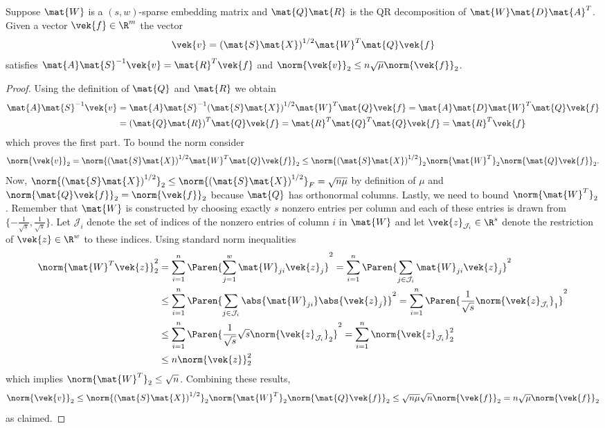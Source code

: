 \begin{lemma}\label{thM:perturbation-vector}
Suppose \(\mat{W}\) is a \((s, w)\)-sparse embedding matrix and \(\mat{Q}\mat{R}\) is the QR decomposition of \(\mat{W}\mat{D}\mat{A}^T\).
Given a vector \(\vek{f} \in \R^m\) the vector
\[ \vek{v} = {(\mat{S}\mat{X})}^{1/2} \mat{W}^T \mat{Q} \vek{f} \]
satisfies \( \mat{A}\mat{S}^{-1}\vek{v} = \mat{R}^T \vek{f} \) and \(\norm{\vek{v}}_2 \leq n \sqrt{\mu} \norm{\vek{f}}_2\).
\end{lemma}
\begin{proof}
Using the definition of \(\mat{Q}\) and \(\mat{R}\) we obtain
\begin{align*}
  \mat{A} \mat{S}^{-1} \vek{v}
  &= \mat{A} \mat{S}^{-1} {(\mat{S}\mat{X})}^{1/2} \mat{W}^T \mat{Q} \vek{f}
   = \mat{A} \mat{D} \mat{W}^T \mat{Q} \vek{f} \\
  &= {(\mat{Q} \mat{R})}^T \mat{Q} \vek{f}
   = \mat{R}^T \mat{Q}^T \mat{Q} \vek{f}
   = \mat{R}^T \vek{f}
\end{align*}
which proves the first part.
To bound the norm consider
\[ 
  \norm{\vek{v}}_2
  = \norm{{(\mat{S}\mat{X})}^{1/2} \mat{W}^T \mat{Q} \vek{f}}_2
  \leq \norm{{(\mat{S}\mat{X})}^{1/2}}_2 \norm{\mat{W}^T}_2 \norm{\mat{Q} \vek{f}}_2.
\]
Now, \(\norm{{(\mat{S}\mat{X})}^{1/2}}_2 \leq \norm{{(\mat{S}\mat{X})}^{1/2}}_F = \sqrt{n \mu}\) by definition of \(\mu\) and \(\norm{\mat{Q}\vek{f}}_2 = \norm{\vek{f}}_2\) because \(\mat{Q}\) has orthonormal columns.
Lastly, we need to bound \(\norm{\mat{W}^T}_2\).
Remember that \(\mat{W}\) is constructed by choosing exactly \(s\) nonzero entries per column and each of these entries is drawn from \(\{-\frac{1}{\sqrt{s}}, \frac{1}{\sqrt{s}}\}\).
Let \(\mathcal{J}_i\) denote the set of indices of the nonzero entries of column \(i\) in \(\mat{W}\) and let \(\vek{z}_{\mathcal{J}_i} \in \R^s\) denote the restriction of \(\vek{z} \in \R^w\) to these indices.
Using standard norm inequalities
\begin{align*}
  \norm{\mat{W}^T \vek{z}}_2^2 &= \sum_{i=1}^{n} \Paren{ \sum_{j=1}^{w} \mat{W}_{ji} \vek{z}_j }^2 = \sum_{i=1}^{n} \Paren{ \sum_{j \in \mathcal{J}_i} \mat{W}_{ji} \vek{z}_j }^2 \\
  &\leq \sum_{i=1}^{n} \Paren{ \sum_{j \in \mathcal{J}_i} \abs{\mat{W}_{ji}} \abs{\vek{z}_j} }^2 = \sum_{i=1}^{n} \Paren{ \frac{1}{\sqrt{s}} \norm{\vek{z}_{\mathcal{J}_i}}_1 }^2 \\
  &\leq \sum_{i=1}^{n} \Paren{ \frac{1}{\sqrt{s}} \sqrt{s} \norm{\vek{z}_{\mathcal{J}_i}}_2 }^2 = \sum_{i=1}^{n} \norm{\vek{z}_{\mathcal{J}_i}}_2^2 \\
  &\leq n \norm{\vek{z}}_2^2
\end{align*}
which implies \(\norm{\mat{W}^T}_2 \leq \sqrt{n}\).
Combining these results,
\[ 
  \norm{\vek{v}}_2
  \leq \norm{{(\mat{S}\mat{X})}^{1/2}}_2 \norm{\mat{W}^T}_2 \norm{\mat{Q} \vek{f}}_2
  \leq \sqrt{n \mu} \sqrt{n} \norm{\vek{f}}_2 = n \sqrt{\mu} \norm{\vek{f}}_2
\]
as claimed.
\end{proof}

